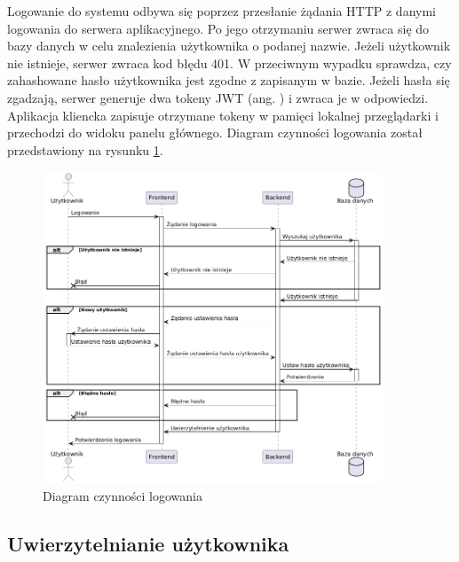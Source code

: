 Logowanie do systemu odbywa się poprzez przesłanie żądania HTTP z danymi logowania do serwera aplikacyjnego. Po jego otrzymaniu serwer zwraca się do bazy danych w celu znalezienia użytkownika o podanej nazwie. Jeżeli użytkownik nie istnieje, serwer zwraca kod błędu 401. W przeciwnym wypadku sprawdza, czy zahashowane hasło użytkownika jest zgodne z zapisanym w bazie. Jeżeli hasła się zgadzają, serwer generuje dwa tokeny JWT (ang. ) i zwraca je w odpowiedzi. Aplikacja kliencka zapisuje otrzymane tokeny w pamięci lokalnej przeglądarki i przechodzi do widoku panelu głównego. Diagram czynności logowania został przedstawiony na rysunku \ref{fig:login}.

\begin{figure}[H]
    \centering
    \includegraphics[width=0.9\textwidth]{graf/loginSequence.png}
    \caption{Diagram czynności logowania}
    \label{fig:login}
\end{figure}

\subsection{Uwierzytelnianie użytkownika}

